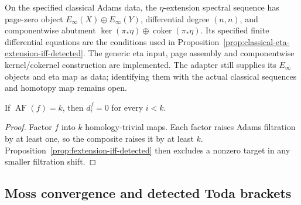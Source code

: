 \begin{definition}
  \label{def:classical-eta-ess-concrete}
  \notready
  On the specified classical Adams data, the $\eta$-extension spectral
  sequence has page-zero object
  $E_\infty(X)\oplus E_\infty(Y)$, differential degree $(n,n)$, and
  componentwise abutment $\ker(\pi_*\eta)\oplus\operatorname{coker}(\pi_*\eta)$.
  Its specified finite differential equations are the conditions used
  in Proposition~\ref{prop:classical-eta-extension-iff-detected}.
  The generic eta input, page assembly and componentwise kernel/cokernel
  construction are implemented. The adapter still supplies its
  $E_\infty$ objects and eta map as data; identifying them with the
  actual classical sequences and homotopy map remains open.
\end{definition}

\begin{corollary}
  \label{cor:fess-below-map-filtration-zero}
  \notready
  If $\operatorname{AF}(f)=k$, then $d_i^f=0$ for every $i<k$.
\end{corollary}

\begin{proof}
  Factor $f$ into $k$ homology-trivial maps.  Each factor raises Adams
  filtration by at least one, so the composite raises it by at least $k$.
  Proposition~\ref{prop:fextension-iff-detected} then excludes a nonzero
  target in any smaller filtration shift.
\end{proof}

\subsection{Moss convergence and detected Toda brackets}

